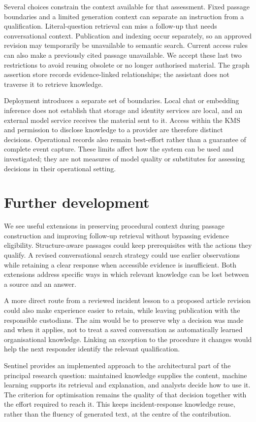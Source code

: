 Several choices constrain the context available for that assessment. Fixed passage boundaries and a limited generation context can separate an instruction from a qualification. Literal-question retrieval can miss a follow-up that needs conversational context. Publication and indexing occur separately, so an approved revision may temporarily be unavailable to semantic search. Current access rules can also make a previously cited passage unavailable. We accept these last two restrictions to avoid reusing obsolete or no longer authorised material. The graph assertion store records evidence-linked relationships; the assistant does not traverse it to retrieve knowledge.

Deployment introduces a separate set of boundaries. Local chat or embedding inference does not establish that storage and identity services are local, and an external model service receives the material sent to it. Access within the KMS and permission to disclose knowledge to a provider are therefore distinct decisions. Operational records also remain best-effort rather than a guarantee of complete event capture. These limits affect how the system can be used and investigated; they are not measures of model quality or substitutes for assessing decisions in their operational setting.

\section{Further development}
We see useful extensions in preserving procedural context during passage construction and improving follow-up retrieval without bypassing evidence eligibility. Structure-aware passages could keep prerequisites with the actions they qualify. A revised conversational search strategy could use earlier observations while retaining a clear response when accessible evidence is insufficient. Both extensions address specific ways in which relevant knowledge can be lost between a source and an answer.

A more direct route from a reviewed incident lesson to a proposed article revision could also make experience easier to retain, while leaving publication with the responsible custodians. The aim would be to preserve why a decision was made and when it applies, not to treat a saved conversation as automatically learned organisational knowledge. Linking an exception to the procedure it changes would help the next responder identify the relevant qualification.

Sentinel provides an implemented approach to the architectural part of the principal research question: maintained knowledge supplies the content, machine learning supports its retrieval and explanation, and analysts decide how to use it. The criterion for optimisation remains the quality of that decision together with the effort required to reach it. This keeps incident-response knowledge reuse, rather than the fluency of generated text, at the centre of the contribution.
